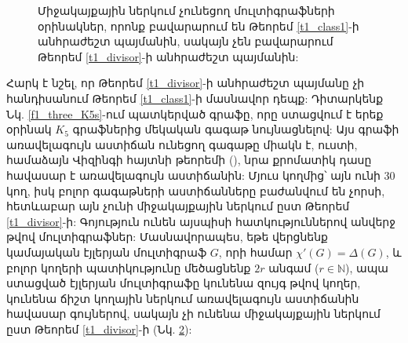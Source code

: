 \begin{figure}[h]
\begin{subfigure}{.5\textwidth}
  
  \caption{}
  \label{f1_multi}
\end{subfigure}
\caption{Միջակայքային ներկում չունեցող մուլտիգրաֆների օրինակներ, որոնք բավարարում են Թեորեմ \ref{t1_class1}-ի անհրաժեշտ պայմանին, սակայն չեն բավարարում Թեորեմ \ref{t1_divisor}-ի անհրաժեշտ պայմանին:}
\end{figure}
Հարկ է նշել, որ Թեորեմ \ref{t1_divisor}-ի անհրաժեշտ պայմանը չի հանդիսանում Թեորեմ \ref{t1_class1}-ի մասնավոր դեպք: Դիտարկենք Նկ. \ref{f1_three_K5s}-ում պատկերված գրաֆը, որը ստացվում է երեք օրինակ $K_5$ գրաֆներից մեկական գագաթ նույնացնելով: Այս գրաֆի առավելագույն աստիճան ունեցող գագաթը միակն է, ուստի, համաձայն Վիզինգի հայտնի թեորեմի (\cite{Vizing1965critical}), նրա քրոմատիկ դասը հավասար է առավելագույն աստիճանին: Մյուս կողմից՝ այն ունի 30 կող, իսկ բոլոր գագաթների աստիճանները բաժանվում են չորսի, հետևաբար այն չունի միջակայքային ներկում ըստ Թեորեմ \ref{t1_divisor}-ի: Գոյություն ունեն այսպիսի հատկություններով անվերջ թվով մուլտիգրաֆներ: Մասնավորապես, եթե վերցնենք կամայական էյլերյան մուլտիգրաֆ $G$, որի համար $\chi'(G)=\Delta(G)$, և բոլոր կողերի պատիկությունը մեծացնենք $2r$ անգամ ($r \in \mathbb{N}$), ապա ստացված էյլերյան մուլտիգրաֆը կունենա զույգ թվով կողեր, կունենա ճիշտ կողային ներկում առավելագույն աստիճանին հավասար գույներով, սակայն չի ունենա միջակայքային ներկում ըստ Թեորեմ \ref{t1_divisor}-ի (Նկ. \ref{f1_multi}):

